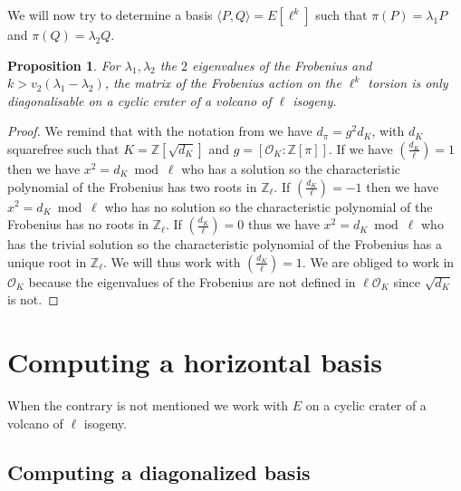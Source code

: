 \documentclass{article}
\theoremstyle{plain}
\newtheorem{prop}[thm]{Proposition}
\theoremstyle{definition}
\theoremstyle{remark}
\begin{document}
We will now try to determine a basis $\langle P,Q \rangle = E[\ell^k]$ such that $\pi(P)=\lambda_1 P $ and $\pi(Q)=\lambda_2 Q $.

\begin{prop}
For $\lambda_1 , \lambda_2$ the $2$ eigenvalues of the Frobenius and $k>v_2(\lambda_1-\lambda_2)$, the matrix of the Frobenius action on the $\ell^k$ torsion is only diagonalisable on a cyclic crater of a volcano of $\ell$ isogeny.
\end{prop}

\begin{proof}
We remind that with the notation from \cite{Fouquet01} \cite{Kohel96} we have $d_{\pi}=g^2d_K$, with $d_K$ squarefree such that $K=\mathbb{Z}[\sqrt{d_K}]$ and $g=[\mathcal{O}_K:\mathbb{Z}[\pi]]$.
\newline
If we have $\left( \frac{d_K}{\ell} \right)=1$ then we have $x^2 = d_K \bmod \ell$ who has a solution so the characteristic polynomial of the Frobenius has two roots in $\mathbb{Z}_{\ell}$. If $\left( \frac{d_K}{\ell} \right)=-1$ then we have $x^2 = d_K \bmod \ell$ who has no solution so the characteristic polynomial of the Frobenius has no roots in $\mathbb{Z}_{\ell}$. If $\left( \frac{d_K}{\ell} \right)=0$ thus we have $x^2 = d_K \bmod \ell$ who has the trivial solution so the characteristic polynomial of the Frobenius has a unique root in $\mathbb{Z}_{\ell}$.
\newline
We will thus work with $\left( \frac{d_K}{\ell} \right)=1$. We are obliged to work in $\mathcal{O}_K$  because the eigenvalues of the Frobenius are not defined in $\ell \mathcal{O}_K$ since $\sqrt{d_K}$ is not.
\end{proof}



\section{Computing a horizontal basis}
When the contrary is  not mentioned we work with $E$ on a cyclic crater of a volcano of $\ell$ isogeny. 

\subsection{Computing a diagonalized basis}
\end{document}

